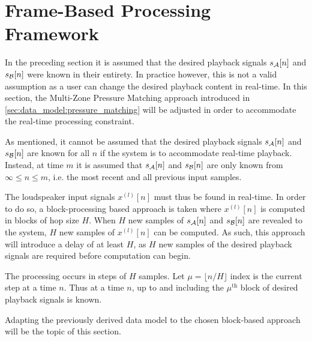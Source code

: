 \section{Frame-Based Processing Framework}
In the preceding section it is assumed that the desired playback signals $s_{\mathcal{A}}[n]$ and $s_{\mathcal{B}}[n]$ were known in their entirety.
In practice however, this is not a valid assumption as a user can change the desired playback content in real-time.
In this section, the Multi-Zone Pressure Matching approach introduced in \autoref{sec:data_model:pressure_matching} will be adjusted 
in order to accommodate the real-time processing constraint.

As mentioned, it cannot be assumed that the desired playback signals $s_{\mathcal{A}}[n]$ and $s_{\mathcal{B}}[n]$ are known for all $n$ 
if the system is to accommodate real-time playback.  
Instead, at time $m$ it is assumed that $s_{\mathcal{A}}[n]$ and $s_{\mathcal{B}}[n]$ are only known from $\infty \leq n \leq m$, 
i.e. the most recent and all previous input samples.

The loudspeaker input signals $x^{(l)}[n]$ must thus be found in real-time.
In order to do so, a block-processing based approach is taken where $x^{(l)}[n]$ is computed in blocks of hop size $H$. 
When $H$ new samples of $s_{\mathcal{A}}[n]$ and $s_{\mathcal{B}}[n]$ are revealed to the system, $H$ new samples of $x^{(l)}[n]$ can be computed.
As such, this approach will introduce a delay of at least $H$, as $H$ new samples of the desired playback signals are required before computation can begin.

The processing occurs in steps of $H$ samples.
Let $\mu = \lfloor n / H \rfloor$ index is the current step at a time $n$.
Thus at a time $n$, up to and including the $\mu^\text{th}$ block of desired playback signals is known.

Adapting the previously derived data model to the chosen block-based approach will be the topic of this section.

